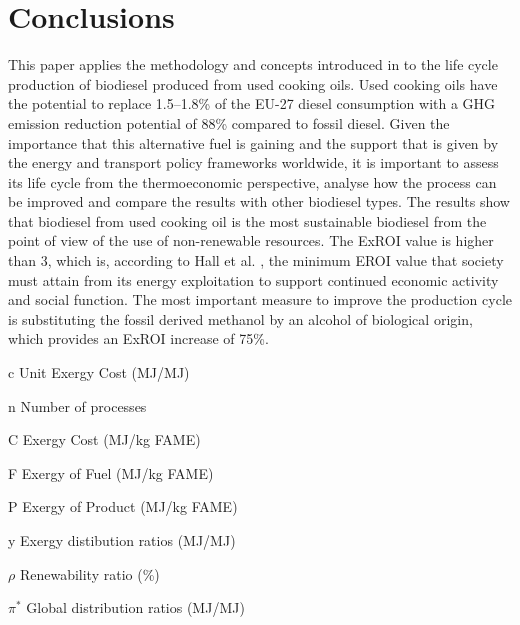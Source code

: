 \documentclass[sustainability,article,submit,moreauthors,pdftex,12pt,a4paper]{mdpi}
\begin{document}

\section{Conclusions}

This paper applies the methodology and concepts introduced in \cite{FontdeMora2012,FontdeMora2013,Torres2012b} to the life cycle production of biodiesel produced from used cooking oils. Used cooking oils have the potential to replace 1.5--1.8\% of the EU-27 diesel consumption with a GHG emission reduction potential of 88\% compared to fossil diesel. Given the importance that this alternative fuel is gaining and the support that is given by the energy and transport policy frameworks worldwide, it is important to assess its life cycle from the thermoeconomic perspective, analyse how the process can be improved and compare the results with other biodiesel types. The results show that biodiesel from used cooking oil is the most sustainable biodiesel from the point of view of the use of non-renewable resources. The ExROI value is higher than 3, which is, according to Hall et al. \cite{Hall2009}, the minimum EROI value that society must attain from its energy exploitation to support continued economic activity and social function. The most important measure to improve the production cycle is substituting the fossil derived methanol by an alcohol of biological origin, which provides an ExROI increase of 75\%.

\makeatletter
\renewcommand\@biblabel[1]{#1.}
\makeatother



\begin{list}{}{
    \renewcommand*{\makelabel}[1]{\hspace{\labelsep}\raggedleft #1}  
    \setlength{\labelwidth}{3em}
    \setlength{\leftmargin}{\labelwidth}
    \setlength{\parsep}{0pt}
    \setlength{\itemsep}{0pt}
    \sloppy}
    \item[c] Unit Exergy Cost (MJ/MJ)
    \item[n] Number of processes
    \item[C] Exergy Cost (MJ/kg FAME) 
    \item[F] Exergy of Fuel (MJ/kg FAME)
    \item[P] Exergy of Product (MJ/kg FAME)
    \item[y] Exergy distibution ratios (MJ/MJ)
    \item[$\rho$] Renewability ratio (\%)
    \item[$\pi^*$] Global distribution ratios (MJ/MJ)
\end{list}
\end{document}

